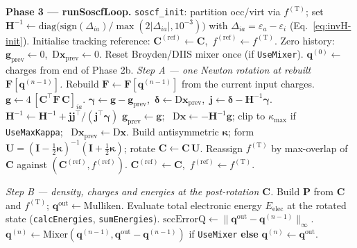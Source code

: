 \documentclass[11pt,a4paper]{article}
\newcommand{\kkappa}{\bm{\kappa}}
\newcommand{\xx}{\mathbf{x}}
\newcommand{\gg}{\mathbf{g}}
\newcommand{\HH}{\mathbf{H}}
\newcommand{\FF}{\mathbf{F}}
\newcommand{\CC}{\mathbf{C}}
\newcommand{\UU}{\mathbf{U}}
\newcommand{\II}{\mathbf{I}}
\newcommand{\qq}{\mathbf{q}}
\begin{document}
\begin{algorithm}[H]
\caption{Phase 3--4: SOSCF outer loop (skipped if Phase 2a ran) and
output.}
\label{alg:full-SOSCF}
\footnotesize
\begin{algorithmic}[1]

\State \textbf{Phase 3 --- runSoscfLoop.}
\State \texttt{soscf\_init}: partition occ/virt via $f^{(\mathrm{T})}$; set
$\HH^{-1}\gets\mathrm{diag}\!\big(\mathrm{sign}(\Delta_{ia})/\max(2|\Delta_{ia}|,10^{-3})\big)$
with $\Delta_{ia}=\varepsilon_a-\varepsilon_i$ (Eq.~\eqref{eq:invH-init}).
\State Initialise tracking reference: $\CC^{(\mathrm{ref})}\gets\CC$,\ $f^{(\mathrm{ref})}\gets f^{(\mathrm{T})}$.
\State Zero history: $\gg_{\mathrm{prev}}\gets 0$,\ $\mathrm{D}\xx_{\mathrm{prev}}\gets 0$.
\State Reset Broyden/DIIS mixer once (if \texttt{UseMixer}). $\qq^{(0)}\gets$ charges from end of Phase 2b.
  \Statex\quad\textit{Step A --- one Newton rotation at rebuilt $\FF[\qq^{(n-1)}]$.}
  \State Rebuild $\FF\gets\FF[\qq^{(n-1)}]$ from the current input charges.
    \State $\gg\gets 4\,[\CC^{\top}\FF\,\CC]_{ia}$.
      \State $\bm{\gamma}\gets\gg-\gg_{\mathrm{prev}}$,\ $\bm{\delta}\gets\mathrm{D}\xx_{\mathrm{prev}}$,\ $\bm{j}\gets\bm{\delta}-\HH^{-1}\bm{\gamma}$.
       $\HH^{-1}\gets\HH^{-1}+\bm{j}\bm{j}^{\top}/(\bm{j}^{\top}\bm{\gamma})$ \EndIf{}
    \EndIf
    \State $\gg_{\mathrm{prev}}\gets\gg$; \ $\mathrm{D}\xx\gets-\HH^{-1}\gg$; clip to $\kappa_\mathrm{max}$ if \texttt{UseMaxKappa}; \ $\mathrm{D}\xx_{\mathrm{prev}}\gets\mathrm{D}\xx$.
    \State Build antisymmetric $\kkappa$; form $\UU=(\II-\tfrac12\kkappa)^{-1}(\II+\tfrac12\kkappa)$; rotate $\CC\gets\CC\,\UU$.
    \State Reassign $f^{(\mathrm{T})}$ by max-overlap of $\CC$ against $(\CC^{(\mathrm{ref})},f^{(\mathrm{ref})})$.
  \EndFor
   $\CC^{(\mathrm{ref})}\gets\CC$,\ $f^{(\mathrm{ref})}\gets f^{(\mathrm{T})}$. \EndIf {}

  \Statex\quad\textit{Step B --- density, charges and energies at the post-rotation $\CC$.}
  \State Build $\mathbf{P}$ from $\CC$ and $f^{(\mathrm{T})}$; $\qq^{\mathrm{out}}\gets\mathrm{Mulliken}$.
  \State Evaluate total electronic energy $E_\mathrm{elec}$ at the rotated state (\texttt{calcEnergies}, \texttt{sumEnergies}).
  \State $\mathrm{sccErrorQ}\gets\|\qq^{\mathrm{out}}-\qq^{(n-1)}\|_\infty$.
  \State $\qq^{(n)}\gets\mathrm{Mixer}(\qq^{(n-1)},\qq^{\mathrm{out}}-\qq^{(n-1)})$ if \texttt{UseMixer} \textbf{else} $\qq^{(n)}\gets\qq^{\mathrm{out}}$. 


\end{algorithmic}
\end{algorithm}
\end{document}
